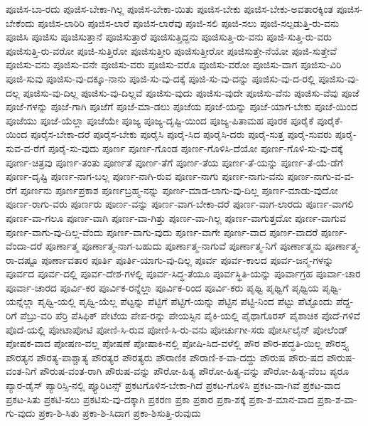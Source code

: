 {ಪೂಜಿಸ-ಬಾ-ರದು
ಪೂಜಿಸ-ಬೇಕಾ-ಗಿಲ್ಲ
ಪೂಜಿಸ-ಬೇಕಾ-ಯಿತು
ಪೂಜಿಸ-ಬೇಕು
ಪೂಜಿಸ-ಬೇಕು-ಅವತಾರಕ್ಕಿಂತ
ಪೂಜಿಸ-ಬೇಕೆಂದು
ಪೂಜಿಸ-ಲಾರಿರಿ
ಪೂಜಿಸ-ಲಾರೆ
ಪೂಜಿಸ-ಲಾರೆವು
ಪೂಜಿ-ಸಲಿ
ಪೂಜಿ-ಸಲು
ಪೂಜಿ-ಸಲ್ಪಡುತ್ತಿ-ರು-ವನು
ಪೂಜಿಸಿ
ಪೂಜಿಸು
ಪೂಜಿಸುತ್ತಾನೆ
ಪೂಜಿಸುತ್ತಾರೆ
ಪೂಜಿಸುತ್ತಿದ್ದನು
ಪೂಜಿಸುತ್ತಿ-ರು-ವನು
ಪೂಜಿ-ಸುತ್ತಿ-ರು-ವರು
ಪೂಜಿಸುತ್ತಿ-ರು-ವರೋ
ಪೂಜಿ-ಸುತ್ತಿರೋ
ಪೂಜಿಸುತ್ತೀರಿ
ಪೂಜಿಸುತ್ತೀರೋ
ಪೂಜಿಸುತ್ತೇ-ನೆಯೋ
ಪೂಜಿ-ಸುತ್ತೇವೆ
ಪೂಜಿಸು-ವನು
ಪೂಜಿಸು-ವನೇ
ಪೂಜಿಸು-ವರು
ಪೂಜಿಸು-ವರೊ
ಪೂಜಿಸು-ವರೋ
ಪೂಜಿಸು-ವಾಗ
ಪೂಜಿಸು-ವಿರಿ
ಪೂಜಿ-ಸುವು
ಪೂಜಿಸು-ವು-ದಕ್ಕೂ-ನಾನು
ಪೂಜಿ-ಸು-ವು-ದಕ್ಕೆ
ಪೂಜಿ-ಸು-ವು-ದನ್ನು
ಪೂಜಿಸು-ವು-ದ-ರಲ್ಲಿ
ಪೂಜಿಸು-ವು-ದಲ್ಲ
ಪೂಜಿಸು-ವು-ದಿಲ್ಲ
ಪೂಜಿಸು-ವು-ದಿಲ್ಲವೆ
ಪೂಜಿಸು-ವುದು
ಪೂಜಿಸು-ವುದೇ
ಪೂಜಿಸು-ವೆನು
ಪೂಜಿಸು-ವೆವು
ಪೂಜೆ
ಪೂಜೆ-ಗಳನ್ನು
ಪೂಜೆ-ಗಾಗಿ
ಪೂಜೆಗೆ
ಪೂಜೆ-ಮಾ-ಡಲು
ಪೂಜೆಯ
ಪೂಜೆ-ಯನ್ನು
ಪೂಜೆ-ಯಾಗ-ಬೇಕು
ಪೂಜೆ-ಯಿಂದ
ಪೂಜೆಯು
ಪೂಜೆ-ಯೆಲ್ಲಾ
ಪೂಜೆಯೇ
ಪೂಜ್ಯ
ಪೂಜ್ಯ-ದೃಷ್ಟಿ-ಯಿಂದ
ಪೂಜ್ಯ-ಪಿತಾಮಹ
ಪೂರಕ
ಪೂರೈಕೆ
ಪೂರೈಕೆ-ಯಿಂದ
ಪೂರೈಸ-ಬೇಕಾ-ದರೆ
ಪೂರೈಸ-ಬೇಕು
ಪೂರೈಸಿ
ಪೂರೈ-ಸಿದ
ಪೂರೈಸಿ-ದರು
ಪೂರೈ-ಸುತ್ತ
ಪೂರೈ-ಸುವರು
ಪೂರೈ-ಸುವ-ವ-ರೆಗೆ
ಪೂರೈ-ಸು-ವುದು
ಪೂರ್ಣ
ಪೂರ್ಣ-ಗೊಂಡ
ಪೂರ್ಣ-ಗೊಳಿಸಿ-ದೆಯೋ
ಪೂರ್ಣ-ಗೊಳಿ-ಸು-ವು-ದಕ್ಕೆ
ಪೂರ್ಣ-ಚಿತ್ರವು
ಪೂರ್ಣ-ತಂತು
ಪೂರ್ಣತೆ
ಪೂರ್ಣ-ತೆಗೆ
ಪೂರ್ಣ-ತೆಯ
ಪೂರ್ಣ-ತೆ-ಯನ್ನು
ಪೂರ್ಣ-ತೆ-ಯೆ-ಡೆಗೆ
ಪೂರ್ಣ-ದೃಷ್ಟಿ
ಪೂರ್ಣ-ನಾಗ-ಬಲ್ಲ
ಪೂರ್ಣ-ನಾಗಿ-ರುವ
ಪೂರ್ಣ-ನಾಗು
ಪೂರ್ಣ-ನಾಗು-ವನು
ಪೂರ್ಣ-ನಾಗು-ವ-ವ-ರೆಗೆ
ಪೂರ್ಣನು
ಪೂರ್ಣಪ್ರಕಾಶ
ಪೂರ್ಣಬ್ರಹ್ಮ-ನನ್ನು
ಪೂರ್ಣ-ಮಾಡ-ಲಾಗು-ವು-ದಿಲ್ಲ
ಪೂರ್ಣ-ಮಾಡು-ವುದೋ
ಪೂರ್ಣ-ರಾಗು-ವರು
ಪೂರ್ಣರು
ಪೂರ್ಣ-ವನ್ನು
ಪೂರ್ಣ-ವಾಗ-ಬೇಕಾ-ದರೆ
ಪೂರ್ಣ-ವಾಗ-ಲಾರದು
ಪೂರ್ಣ-ವಾಗಲಿ
ಪೂರ್ಣ-ವಾ-ಗಲೂ
ಪೂರ್ಣ-ವಾಗಿ
ಪೂರ್ಣ-ವಾ-ಗಿತ್ತು
ಪೂರ್ಣ-ವಾ-ಗಿಲ್ಲ
ಪೂರ್ಣ-ವಾಗುತ್ತದೋ
ಪೂರ್ಣ-ವಾಗುವ
ಪೂರ್ಣ-ವಾಗು-ವು-ದಿಲ್ಲ-ವೆಂದು
ಪೂರ್ಣ-ವಾಗು-ವುದು
ಪೂರ್ಣ-ವಾಗೇ
ಪೂರ್ಣ-ವಾದ
ಪೂರ್ಣ-ವಾದರೆ
ಪೂರ್ಣ-ವೆಂದಾ-ದರೆ
ಪೂರ್ಣಾತ್ಮ
ಪೂರ್ಣಾತ್ಮ-ನಾಗ-ಬಹುದು
ಪೂರ್ಣಾತ್ಮ-ನಾಗುವೆ
ಪೂರ್ಣಾತ್ಮ-ನಿಗೆ
ಪೂರ್ಣಾತ್ಮನು
ಪೂರ್ಣಾತ್ಮ-ರಾ-ದಷ್ಟೂ
ಪೂರ್ಣಾವತಾರ
ಪೂರ್ತಿ
ಪೂರ್ತಿ-ಯಾಗು-ವು-ದಿಲ್ಲ
ಪೂರ್ವ
ಪೂರ್ವ-ಕಾಲದ
ಪೂರ್ವ-ಜನ್ಮ-ಗಳನ್ನು
ಪೂರ್ವದ
ಪೂರ್ವ-ದಲ್ಲಿ
ಪೂರ್ವ-ದೇಶ-ಗಳಲ್ಲಿ
ಪೂರ್ವ-ಸಿದ್ಧ-ತೆಯೂ
ಪೂರ್ವಸ್ಥಿತಿ-ಯನ್ನು
ಪೂರ್ವಾಗ್ರಹ
ಪೂರ್ವಾ-ಚಾರ
ಪೂರ್ವಾ-ಚಾರದ
ಪೂರ್ವಿ-ಕರ
ಪೂರ್ವಿಕ-ರನ್ನೆಲ್ಲಾ
ಪೂರ್ವಿಕ-ರಿಂದ
ಪೂರ್ವಿ-ಕರು
ಪೃಥ್ವಿ
ಪೃಥ್ವಿಗೆ
ಪೃಥ್ವಿಯ
ಪೃಥ್ವಿ-ಯನ್ನೆಲ್ಲಾ
ಪೃಥ್ವಿ-ಯಲ್ಲಿ
ಪೃಥ್ವಿ-ಯೆಲ್ಲ
ಪೆಟ್ಟನ್ನು
ಪೆಟ್ಟಿಗೆ
ಪೆಟ್ಟಿಗೆ-ಯನ್ನು
ಪೆಟ್ಟಿನ
ಪೆಟ್ಟಿ-ನಿಂದ
ಪೆಟ್ಟು
ಪೆಟ್ಟೊಂದು
ಪೆದ್ದ-ರಿಗೆ
ಪೆಬ್ರು-ವರಿ
ಪೆರ್ರಿ
ಪೆಸಿಫಿಕ್
ಪೇಟೆಯ
ಪೇಪ-ರನ್ನು
ಪೇಯಸ್ಸಿನ
ಪೈಕಿ-ಯಲ್ಲಿ
ಪೈಥಾಗೊರಸ್
ಪೈಶಾಚಿಕ
ಪೊದೆ-ಗಳಿವೆ
ಪೊದೆ-ಯಲ್ಲಿ
ಪೋಟಾಪೋಟಿ
ಪೋಣಿ-ಸಿ-ರುವ
ಪೋಣಿ-ಸಿ-ರು-ವನು
ಪೋರ್ಚುಗೀ-ಸರು
ಪೋರ್ಸಿಲೈನ್
ಪೋಲೆಂಡ್
ಪೋಷಕ-ವಾದ
ಪೋಷಣ-ವಲ್ಲ
ಪೋಷಣೆ
ಪೋಷಾಕಿ-ನಲ್ಲಿ
ಪೋಷಿ-ಸಿದ-ವಳೆಲ್ಲಿ
ಪೌರ
ಪೌರ-ಪದ್ಧತಿ-ಯಿಲ್ಲ
ಪೌರಸ್ತ್ಯ
ಪೌರತ್ಯನ
ಪೌರತ್ಯ-ಪಾಶ್ಚಾತ್ಯ
ಪೌರತ್ಯರ
ಪೌರತ್ಯರು
ಪೌರಾಣಿಕ
ಪೌರಾಣಿ-ಕ-ವಾ-ದದ್ದು
ಪೌರುಷ
ಪೌರು-ಷದ
ಪೌರುಷ-ವಂತ-ನಿಗೆ
ಪೌರುಷ-ವಂತ-ರಾಗಿ
ಪೌರುಷ-ವನ್ನು
ಪೌರೋ-ಹಿತ್ಯ
ಪೌರೋ-ಹಿತ್ಯ-ವನ್ನು
ಪೌರೋ-ಹಿತ್ಯ-ವೆಂಬ
ಪ್ಯರೂ
ಪ್ಯಾರ-ಡೈಸ್
ಪ್ಯಾರಿಸ್ಸಿ-ನಲ್ಲಿ
ಪ್ಯೂರಿಟನ್ಸ್
ಪ್ರಕಟಗೊಳಿಸ-ಬೇಕಾ-ಗಿದೆ
ಪ್ರಕಟ-ಗೊಳಿಸಿ
ಪ್ರಕಟ-ವಾ-ಗಿವೆ
ಪ್ರಕಟ-ವಾದ
ಪ್ರಕಟ-ಸಿತು
ಪ್ರಕಟಿ-ಸಲು
ಪ್ರಕಟಿಸು-ವು-ದಕ್ಕಾಗಿ
ಪ್ರಕರಣ
ಪ್ರಕಾ
ಪ್ರಕಾರ
ಪ್ರಕಾ-ಶಕ್ಕೆ
ಪ್ರಕಾ-ಶ-ಮಾನ-ವಾದ
ಪ್ರಕಾ-ಶ-ವಾ-ಗು-ವುದು
ಪ್ರಕಾ-ಶಿ-ಸಿತು
ಪ್ರಕಾ-ಶಿ-ಸಿದಾಗ
ಪ್ರಕಾ-ಶಿಸುತ್ತಿ-ರುವುದು
}
